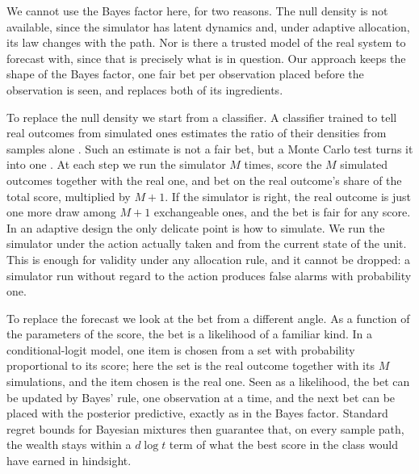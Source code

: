 We cannot use the Bayes factor here, for two reasons. The null density is not
available, since the simulator has latent dynamics and, under adaptive
allocation, its law changes with the path. Nor is there a trusted model of the
real system to forecast with, since that is precisely what is in question.
Our approach keeps the shape of the Bayes factor, one fair bet per
observation placed before the observation is seen, and replaces both of its
ingredients.

To replace the null density we start from a classifier. A classifier trained
to tell real outcomes from simulated ones estimates the ratio of their
densities from samples alone \citep{thomas2022lfire}. Such an estimate is not
a fair bet, but a Monte Carlo test turns it into one
\citep{besag1989generalized}. At each step we run the simulator $M$ times,
score the $M$ simulated outcomes together with the real one, and bet on the
real outcome's share of the total score, multiplied by $M+1$. If the simulator
is right, the real outcome is just one more draw among $M+1$ exchangeable
ones, and the bet is fair for any score. In an adaptive design the only
delicate point is how to simulate. We run the simulator under the action
actually taken and from the current state of the unit. This is enough for
validity under any allocation rule, and it cannot be dropped: a simulator run
without regard to the action produces false alarms with probability one.

To replace the forecast we look at the bet from a different angle. As a
function of the parameters of the score, the bet is a likelihood of a familiar
kind. In a conditional-logit model, one item is chosen from a set with
probability proportional to its score; here the set is the real outcome
together with its $M$ simulations, and the item chosen is the real one. Seen
as a likelihood, the bet can be updated by Bayes' rule, one observation at a
time, and the next bet can be placed with the posterior predictive, exactly as
in the Bayes factor. Standard regret bounds for Bayesian mixtures
\citep{kakade2005online} then guarantee that, on every sample path, the wealth
stays within a $d\log t$ term of what the best score in the class would have
earned in hindsight.

